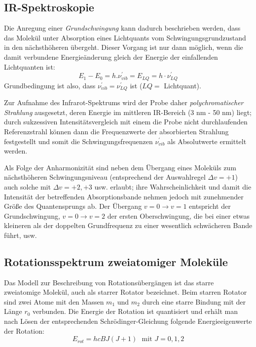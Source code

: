 \documentclass[12pt]{article}
\begin{document}
\subsection{IR-Spektroskopie}
Die Anregung einer \textit{Grundschwingung} kann dadurch beschrieben werden,
dass das Molekül unter Absorption eines Lichtquants vom 
Schwingungsgrundzustand in den nächsthöheren übergeht.
Dieser Vorgang ist nur dann möglich, 
wenn die damit verbundene Energieänderung 
gleich der Energie der einfallenden Lichtquanten ist:
\begin{equation}
  E _1 - E_0 = h. \nu ^{'}_{vib} = E _{LQ} = h \cdot \nu ^{'}_{LQ}
\end{equation}
Grundbedingung ist also, dass $\nu ^{'}_{vib} = \nu ^{'}_{LQ} $ ist ($LQ =$ Lichtquant). \par
Zur Aufnahme des Infrarot-Spektrums wird der Probe daher \textit{polychromatischer Strahlung} ausgesetzt,
deren Energie im mittleren IR-Bereich (3 \si{\nano\meter} - 50 \si{\nano\meter}) liegt; durch sukzessiven
Intensitätsvergleich mit einem die Probe nicht durchlaufenden Referenzstrahl können dann die Frequenzwerte
der absorbierten Strahlung festgestellt und somit die Schwingungsfrequenzen $\nu ^{'}_{vib} $ als Absolutwerte
ermittelt werden. \par
Als Folge der Anharmonizität sind neben dem Übergang eines Moleküls zum nächsthöheren Schwingungsniveau
(entsprechend der Auswahlregel $ \Delta v = +1$) auch solche mit $ \Delta v = +2, +3$ usw. erlaubt;
ihre Wahrscheinlichkeit und damit die Intensität der betreffenden Absorptionsbande nehmen
jedoch mit zunehmender Größe des Quantensprungs ab. Der Übergang $v =0 \rightarrow v =1$ entspricht der Grundschwingung,
$ v =0 \rightarrow v=2 $ der ersten Oberschwingung, die bei einer etwas kleineren als der doppelten Grundfrequenz
zu einer wesentlich schwächeren Bande führt, usw.
\subsection{Rotationsspektrum zweiatomiger Moleküle~\supercite{rovib}}
Das Modell zur Beschreibung von Rotationsübergängen 
ist das starre zweiatomige Molekül, auch als starrer Rotator bezeichnet. 
Beim starren Rotator sind zwei Atome mit den Massen $m_1$ und $m_2$ 
durch eine starre Bindung mit der Länge $r_0$ verbunden. 
Die Energie der Rotation ist quantisiert und erhält man nach Lösen 
der entsprechenden Schrödinger-Gleichung folgende Energieeigenwerte der Rotation:
\begin{equation}
\label{eq:erot}
E_{rot} = hc B J (J+1) \,\, \text{ mit } J = 0, 1,2 
\end{equation}
\end{document}
